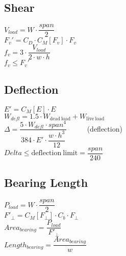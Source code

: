 \documentclass[12pt]{article}
\begin{document}
\subsection{Shear}

$V_{load} = W \cdot \dfrac{span}{2}$
\\[1.0ex]
$F_v' = C_D \cdot C_M[F_v] \cdot F_v$
\\[1.0ex]
$f_v = 3 \cdot \dfrac{V_{load}}{2 \cdot w \cdot h}$
\\[1.0ex]
$f_v \leq F_v'$

\newpage

\subsection{Deflection}

$E' = C_M[E] \cdot E$
\\[1.0ex]
$W_{defl} = 1.5 \cdot W_{\mathrm{dead~load}} + W_{\mathrm{live~load}}$
\\[1.0ex]
$\Delta = \dfrac{5 \cdot W_{defl} \cdot span^4}
                {384 \cdot E' \cdot \dfrac{w \cdot h^3}{12}}$
		~~~~~(deflection)
\\[1.0ex]
$Delta \leq {\mathrm{deflection~limit}} = \dfrac{span}{240}$

\subsection{Bearing Length}

$P_{load} = W \cdot \dfrac{span}{2}$
\\[1.0ex]
$F'_\perp = C_M[F_\perp] \cdot C_b \cdot F_\perp$
\\[1.0ex]
$Area_{bearing} = \dfrac{P_{load}}{F'_\perp}$
\\[1.0ex]
$Length_{bearing} = \dfrac{Area_{bearing}}{w}$
\end{document}
